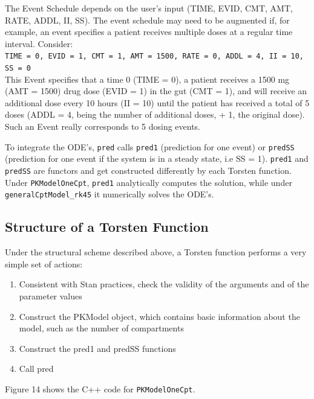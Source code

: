 \documentclass[11pt]{amsart}
\begin{document}
The Event Schedule depends on the user's input (TIME, EVID, CMT, AMT, RATE, ADDL, II, SS). The event schedule may need to be augmented if, for example, an event specifies a patient receives multiple doses at a regular time interval. Consider: \\

\texttt{TIME = 0, EVID = 1, CMT = 1, AMT = 1500, RATE = 0, ADDL = 4, II = 10, SS = 0} \\

This Event specifies that a time 0 (TIME = 0), a patient receives a 1500 mg (AMT = 1500) drug dose (EVID = 1) in the gut (CMT = 1), and will receive an additional dose every 10 hours (II = 10) until the patient has received a total of 5 doses (ADDL = 4, being the number of additional doses, + 1, the original dose). Such an Event really corresponds to 5 dosing events.

To integrate the ODE's, \texttt{pred} calls \texttt{pred1} (prediction for one event) or \texttt{predSS} (prediction for one event if the system is in a steady state, i.e SS = 1). \texttt{pred1} and \texttt{predSS} are functors and get constructed differently by each Torsten function. Under \texttt{PKModelOneCpt}, \texttt{pred1} analytically computes the solution, while under \texttt{generalCptModel\_rk45} it numerically solves the ODE's.
 
\subsection*{Structure of a Torsten Function} 
Under the structural scheme described above, a Torsten function performs a very simple set of actions:
\begin{enumerate}
  \item Consistent with Stan practices, check the validity of the arguments and of the parameter values
  \item Construct the PKModel object, which contains basic information about the model, such as the number of compartments
  \item Construct the pred1 and predSS functions
  \item Call pred
\end{enumerate}  

Figure 14 shows the C++ code for \texttt{PKModelOneCpt}.
\end{document}
